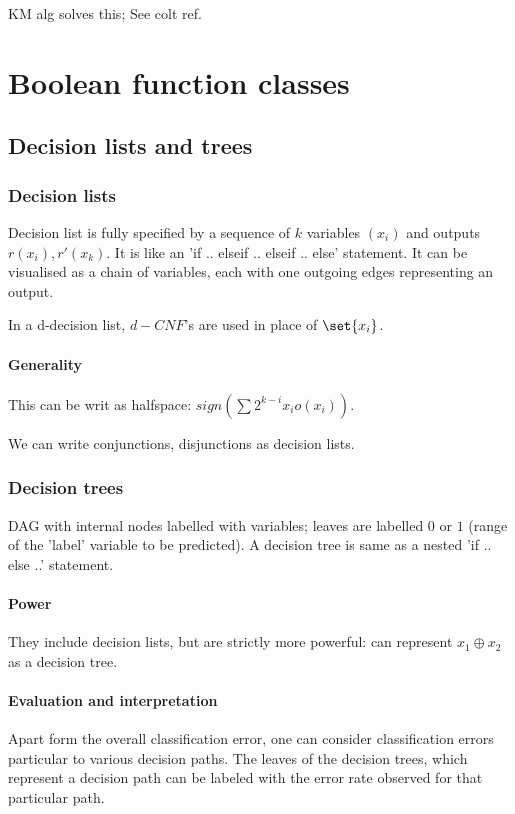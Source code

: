 \documentclass[oneside, article]{memoir}
\begin{document}
KM alg solves this; See colt ref.


\part{Boolean function classes}
\chapter{Decision lists and trees}
\section{Decision lists}
Decision list is fully specified by a sequence of $k$ variables $(x_{i})$ and outputs $r(x_{i}), r'(x_k)$. It is like an 'if .. elseif .. elseif .. else' statement. It can be visualised as a chain of variables, each with one outgoing edges representing an output.

In a d-decision list, $d-CNF$'s are used in place of $\set{x_i}$.

\subsection{Generality}
This can be writ as halfspace: $sign(\sum 2^{k-i}x_{i}o(x_{i}))$.

We can write conjunctions, disjunctions as decision lists.

\section{Decision trees}
DAG with internal nodes labelled with variables; leaves are labelled $0$ or $1$ (range of the 'label' variable to be predicted). A decision tree is same as a nested 'if .. else ..' statement.

\subsection{Power}
They include decision lists, but are strictly more powerful: can represent $x_{1} \oplus x_{2}$ as a decision tree.

\subsection{Evaluation and interpretation}
Apart form the overall classification error, one can consider classification errors particular to various decision paths. The leaves of the decision trees, which represent a decision path can be labeled with the error rate observed for that particular path.
\end{document}
